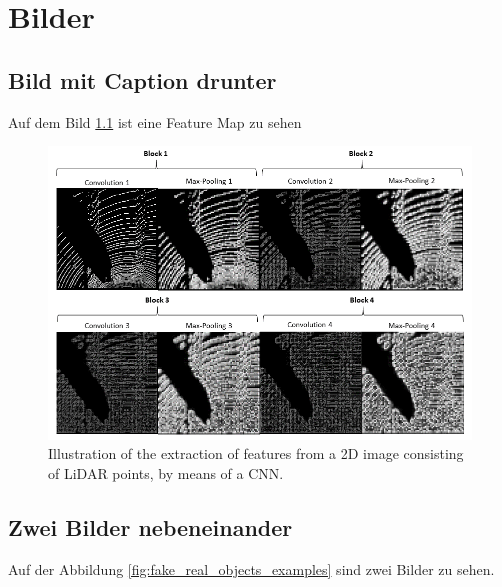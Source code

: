 \chapter{Bilder}
\section{Bild mit Caption drunter}

Auf dem Bild \ref{fig:featuremap} ist eine Feature Map zu sehen

\begin{figure}[h]
  \centering
  \includegraphics[width=\columnwidth]{img/feature_map.png}
  \caption{Illustration of the extraction of features from a 2D image consisting of LiDAR points, by means of a CNN.} \label{fig:featuremap}
\end{figure}


\section{Zwei Bilder nebeneinander}

Auf der Abbildung \ref{fig:fake_real_objects_examples} sind zwei Bilder zu sehen.

